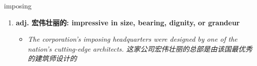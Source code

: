 
\begin{frame}
{\huge imposing}
\begin{center}
\begin{enumerate}\Large
  \item \textbf{adj. 宏伟壮丽的: impressive in size, bearing, dignity, or grandeur}
  \begin{itemize}
    \item \em{\Large{The corporation's imposing headquarters were designed by one of the nation's cutting-edge architects. 这家公司宏伟壮丽的总部是由该国最优秀的建筑师设计的}}
  \end{itemize}
\end{enumerate}
\end{center}
\end{frame}

